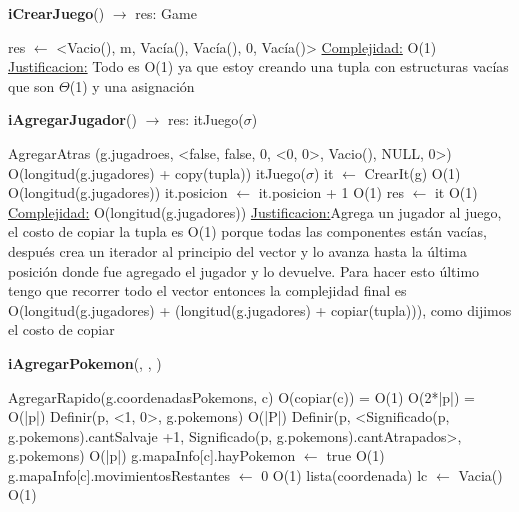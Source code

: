 \begin{Algoritmos}



\begin{algorithm}[H]{\textbf{iCrearJuego}() $\to$ res: Game}
	\begin{algorithmic}[1]
		\State res $\gets$ <Vacio(), m, Vac\'ia(), Vac\'ia(), 0, Vac\'ia()> 
		\medskip
		\Statex \underline{Complejidad:} O(1)
		\Statex \underline{Justificacion:} Todo es O(1) ya que estoy creando una tupla con estructuras vac\'ias que son $\Theta$(1) y una asignaci\'on
	\end{algorithmic}
\end{algorithm}


\begin{algorithm}[H]{\textbf{iAgregarJugador}() $\to$ res: itJuego($\sigma$)}
	\begin{algorithmic}[1]
		\State AgregarAtras (g.jugadroes, <false, false, 0, <0, 0>, Vacio(), NULL, 0>) \Comment O(longitud(g.jugadores) + copy(tupla))
		\State   itJuego($\sigma$) it $\gets$ CrearIt(g) \Comment O(1)
		 \Comment O(longitud(g.jugadores))
			\State it.posicion $\gets$ it.posicion + 1 \Comment O(1)
		\EndWhile
		\State res $\gets$ it \Comment O(1)
		\medskip
		\Statex \underline{Complejidad:} O(longitud(g.jugadores))
		\Statex \underline{Justificacion:}Agrega un jugador al juego, el costo de copiar la tupla es O(1) porque todas las componentes están vacías, después crea un iterador al principio del vector y lo avanza hasta la última posición donde fue agregado el jugador y lo devuelve. Para hacer esto último tengo que recorrer todo el vector entonces la complejidad final es O(longitud(g.jugadores) + (longitud(g.jugadores) + copiar(tupla))), como dijimos el costo de copiar  
	\end{algorithmic}
\end{algorithm}

\begin{algorithm}[H]{\textbf{iAgregarPokemon}(, , )}
	\begin{algorithmic}[1]
		\State AgregarRapido(g.coordenadasPokemons, c) \Comment O(copiar(c)) = O(1)
		 \Comment O(2*|p|) = O(|p|)
			\State Definir(p, <1, 0>, g.pokemons) \Comment O(|P|)
		\Else
			\State Definir(p, <Significado(p, g.pokemons).cantSalvaje +1, Significado(p, g.pokemons).cantAtrapados>, g.pokemons) \Comment O(|p|)
		\EndIf
		\State g.mapaInfo[c].hayPokemon $\gets$ true \Comment O(1)
		\State g.mapaInfo[c].movimientosRestantes $\gets$ 0 \Comment O(1)
		\State lista(coordenada) lc $\gets$ Vacia() \Comment O(1)
		

\end{algorithmic}
\end{algorithm}
\end{Algoritmos}
